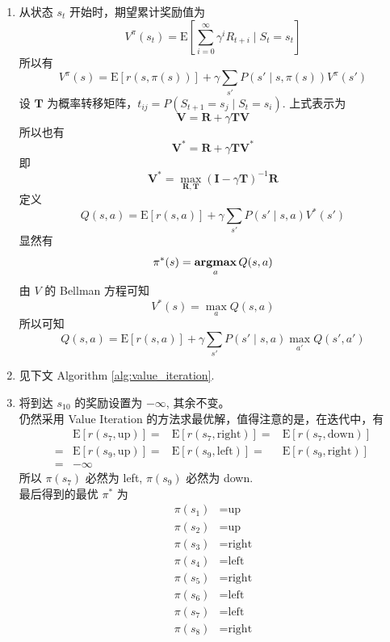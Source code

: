 \documentclass[11pt,letter,notitlepage]{article}
\DeclareMathOperator*{\argmax}{\bf argmax}
\newcommand{\expect}[1]{\text{E} [#1]}
\begin{document}
\begin{solution}
	\begin{enumerate}
		\item  从状态 $s_t$ 开始时，期望累计奖励值为
		      $$V^\pi(s_t)=\expect{\sum_{i=0}^{\infty} \gamma^i R_{t+i} \mid S_t=s_t}$$
		      所以有
		      $$V^\pi(s)=\expect{r(s,\pi(s))}+\gamma \sum_{s'} P(s'\mid s, \pi(s))V^\pi (s')$$
		      设 $\mathbf{T}$ 为概率转移矩阵，$t_{ij}=P(S_{t+1}=s_j \mid S_t=s_i)$. 上式表示为
		      $$\mathbf{V}=\mathbf{R}+\gamma \mathbf{T}\mathbf{V}$$
		      所以也有
		      $$\mathbf{V}^*=\mathbf{R}+\gamma \mathbf{T}\mathbf{V}^*$$
		      即 $$\mathbf{V}^*=\max_{\mathbf{R},\mathbf{T}}(\mathbf{I}-\gamma \mathbf{T})^{-1}\mathbf{R}$$
		      定义
		      $$Q(s,a)=\expect{r(s,a)}+\gamma\sum_{s'}P(s'\mid s,a)V^*(s')$$
		      显然有 $$\pi^*(s)=\argmax_a Q(s,a)$$
		      由 $V$ 的 Bellman 方程可知
		      $$V^*(s)=\max_a Q(s,a)$$
		      所以可知
		      $$Q(s,a)=\expect{r(s,a)}+\gamma \sum_{s'}P(s'\mid s,a)\max_{a'}Q(s',a')$$
		\item 见下文 Algorithm \ref{alg:value_iteration}.
		\item 将到达 $s_{10}$ 的奖励设置为 $-\infty$, 其余不变。\\
		      仍然采用 Value Iteration 的方法求最优解，值得注意的是，在迭代中，有
		      $$\begin{aligned}
				        & \expect{r(s_{7},\text{up})}
				      = & \expect{r(s_{7},\text{right})}
				      = & \expect{r(s_{7},\text{down})}  \\
				      = & \expect{r(s_{9},\text{up})}
				      = & \expect{r(s_{9},\text{left})}
				      = & \expect{r(s_{9},\text{right})} \\
				      = & -\infty
			      \end{aligned}$$
		      所以 $\pi(s_7)$ 必然为 left, $\pi(s_9)$ 必然为 down.\\
		      最后得到的最优 $\pi^*$ 为
		      $$\begin{aligned}
				      \pi(s_1) & = \text{up}    \\
				      \pi(s_2) & = \text{up}    \\
				      \pi(s_3) & = \text{right} \\
				      \pi(s_4) & = \text{left}  \\
				      \pi(s_5) & = \text{right} \\
				      \pi(s_6) & = \text{left}  \\
				      \pi(s_7) & = \text{left}  \\
				      \pi(s_8) & = \text{right} \\

\end{aligned}$$
\end{enumerate}
\end{solution}
\end{document}

